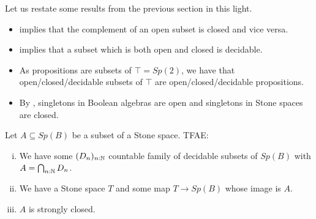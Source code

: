 \begin{remark}
  Let us restate some results from the previous section in this light. 
  \begin{itemize}
    \item   {} implies that the complement of an 
  open subset is closed and vice versa. 
  \item 
     implies that a subset which is both open 
    and closed is decidable. 
  \item 
    As propositions are subsets of $\top = Sp(2)$, 
    we have that open/closed/decidable subsets of $\top$
    are open/closed/decidable propositions. 
  \item By , singletons in 
    Boolean algebras are open and singletons in Stone spaces are closed. 
\end{itemize}
\end{remark}
\begin{theorem}\label{StrongVersionOfEquivalencesOfClosedSubsetsOfStone}
  Let $A\subseteq Sp(B)$ be a subset of a Stone space. TFAE:
  \begin{enumerate}[(i)]
    \item We have some $(D_n)_{n:\mathbb{N}}$ countable family 
      of decidable subsets of $Sp(B)$ with $A = \bigcap_{n:\mathbb{N}} D_n$. 
    \item We have a Stone space $T$ and some map $T\to Sp(B)$ 
      whose image is $A$. 
    \item $A$ is strongly closed. 
  \end{enumerate}
\end{theorem}
